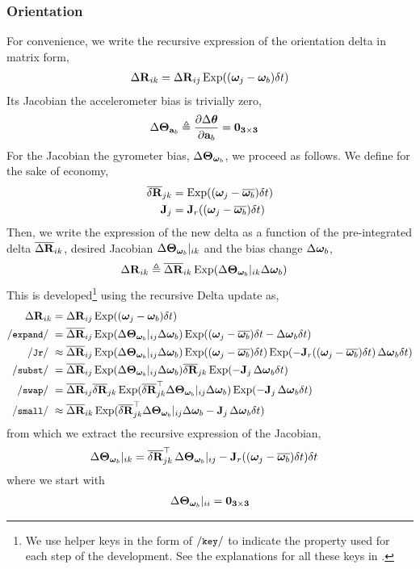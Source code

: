 \subsubsection{Orientation}

For convenience, we write the recursive expression of the orientation delta in matrix form,
%
\begin{align}\label{equ:recursiveDq}
{\Delta{\bf R}}_{ik}={\Delta{\bf R}}_{ij}\operatorname*{Exp}(({{\bm \omega}}_j-{{{\bm \omega}}_b})\delta t)
\end{align}
%
Its Jacobian \wrt the accelerometer bias is trivially zero,
%
\begin{align}
{\Delta{\bm \Theta}}_{{{\bf a}_b}} &\triangleq \frac{\partial{\Delta{{\bm \theta}}}}{\partial{{\bf a}_b}} = \bf0_{3\times3}
\end{align}
%
For the Jacobian \wrt the gyrometer bias, ${\Delta{\bm \Theta}}_{{{{\bm \omega}}_b}}$, we proceed as follows. We define for the sake of economy,
%
\begin{align}
\overline{{\delta{\bf R}}}_{jk} &= \operatorname*{Exp}(({{\bm \omega}}_j-\overline{{{{\bm \omega}}_b}})\delta t) \\
{\bf J}_j &= {\bf J}_r(({{\bm \omega}}_j-\overline{{{{\bm \omega}}_b}})\delta t)
\end{align}
%
Then, we write the expression of the new delta as a function of the pre-integrated delta $\overline{{\Delta{\bf R}}}_{ik}$, desired Jacobian ${\Delta{\bm \Theta}}_{{{{\bm \omega}}_b}}|_{ik}$ and the bias change $\Delta{{{\bm \omega}}_b}$,
%
\begin{align}\label{equ:delta_correct_bias}
{\Delta{\bf R}}_{ik} &\triangleq \overline{{\Delta{\bf R}}}_{ik}\operatorname*{Exp}({\Delta{\bm \Theta}}_{{{{\bm \omega}}_b}}|_{ik}\Delta{{{\bm \omega}}_b}) 
\end{align}
%
This is developed\footnote{We use helper keys in the form of $\com{key}$to indicate the property used for each step of the development. See the explanations for all these keys in .} using the recursive Delta update  as,
%
\begin{align*}
\DR_{ik} &= \DR_{ij}\Exp((\bw_j-\wb)\dt) \\
\cexpand
&= \ol\DR_{ij}\Exp(\DTH_{\wb}|_{ij}\D\wb)\Exp((\bw_j-\ol\wb)\dt - \Dw_b\dt) \\
\cJr
&\approx \ol\DR_{ij}\Exp(\DTH_{\wb}|_{ij}\D\wb)\Exp((\bw_j-\ol\wb)\dt)\Exp( - \bfJ_r((\bw_j-\ol\wb)\dt)\,\Dw_b\dt) \\
\com{subst}
&= \ol\DR_{ij}\Exp(\DTH_{\wb}|_{ij}\D\wb)\ol\dR_{jk}\Exp( - \bfJ_j\,\Dw_b\dt) \\
\cswap
&= \ol\DR_{ij}\ol\dR_{jk}\Exp(\ol\dR_{jk}\tr\DTH_{\wb}|_{ij}\D\wb)\Exp( - \bfJ_j\,\Dw_b\dt) \\
\csmall
&\approx \ol\DR_{ik}\Exp(\ol\dR_{jk}\tr\DTH_{\wb}|_{ij}\D\wb - \bfJ_j\,\Dw_b\dt) \\
\end{align*}
%
from which we extract the recursive expression of the Jacobian,
%
\begin{align}
{\Delta{\bm \Theta}}_{{{{\bm \omega}}_b}}|_{ik} 
&= \overline{{\delta{\bf R}}}_{jk}^{\top}\,{\Delta{\bm \Theta}}_{{{{\bm \omega}}_b}}|_{ij} - {\bf J}_r(({{\bm \omega}}_j-\overline{{{{\bm \omega}}_b}})\delta t)\delta t
\end{align}
%
where we start with
%
\begin{align*}
{\Delta{\bm \Theta}}_{{{{\bm \omega}}_b}}|_{ii} = \bf0_{3\times3}
\end{align*}

